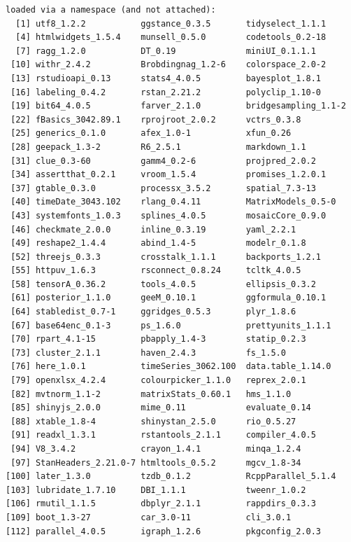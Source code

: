 \documentclass[12pt,twoside]{reedthesis}
\begin{document}
\begin{verbatim}
loaded via a namespace (and not attached):
  [1] utf8_1.2.2           ggstance_0.3.5       tidyselect_1.1.1    
  [4] htmlwidgets_1.5.4    munsell_0.5.0        codetools_0.2-18    
  [7] ragg_1.2.0           DT_0.19              miniUI_0.1.1.1      
 [10] withr_2.4.2          Brobdingnag_1.2-6    colorspace_2.0-2    
 [13] rstudioapi_0.13      stats4_4.0.5         bayesplot_1.8.1     
 [16] labeling_0.4.2       rstan_2.21.2         polyclip_1.10-0     
 [19] bit64_4.0.5          farver_2.1.0         bridgesampling_1.1-2
 [22] fBasics_3042.89.1    rprojroot_2.0.2      vctrs_0.3.8         
 [25] generics_0.1.0       afex_1.0-1           xfun_0.26           
 [28] geepack_1.3-2        R6_2.5.1             markdown_1.1        
 [31] clue_0.3-60          gamm4_0.2-6          projpred_2.0.2      
 [34] assertthat_0.2.1     vroom_1.5.4          promises_1.2.0.1    
 [37] gtable_0.3.0         processx_3.5.2       spatial_7.3-13      
 [40] timeDate_3043.102    rlang_0.4.11         MatrixModels_0.5-0  
 [43] systemfonts_1.0.3    splines_4.0.5        mosaicCore_0.9.0    
 [46] checkmate_2.0.0      inline_0.3.19        yaml_2.2.1          
 [49] reshape2_1.4.4       abind_1.4-5          modelr_0.1.8        
 [52] threejs_0.3.3        crosstalk_1.1.1      backports_1.2.1     
 [55] httpuv_1.6.3         rsconnect_0.8.24     tcltk_4.0.5         
 [58] tensorA_0.36.2       tools_4.0.5          ellipsis_0.3.2      
 [61] posterior_1.1.0      geeM_0.10.1          ggformula_0.10.1    
 [64] stabledist_0.7-1     ggridges_0.5.3       plyr_1.8.6          
 [67] base64enc_0.1-3      ps_1.6.0             prettyunits_1.1.1   
 [70] rpart_4.1-15         pbapply_1.4-3        statip_0.2.3        
 [73] cluster_2.1.1        haven_2.4.3          fs_1.5.0            
 [76] here_1.0.1           timeSeries_3062.100  data.table_1.14.0   
 [79] openxlsx_4.2.4       colourpicker_1.1.0   reprex_2.0.1        
 [82] mvtnorm_1.1-2        matrixStats_0.60.1   hms_1.1.0           
 [85] shinyjs_2.0.0        mime_0.11            evaluate_0.14       
 [88] xtable_1.8-4         shinystan_2.5.0      rio_0.5.27          
 [91] readxl_1.3.1         rstantools_2.1.1     compiler_4.0.5      
 [94] V8_3.4.2             crayon_1.4.1         minqa_1.2.4         
 [97] StanHeaders_2.21.0-7 htmltools_0.5.2      mgcv_1.8-34         
[100] later_1.3.0          tzdb_0.1.2           RcppParallel_5.1.4  
[103] lubridate_1.7.10     DBI_1.1.1            tweenr_1.0.2        
[106] rmutil_1.1.5         dbplyr_2.1.1         rappdirs_0.3.3      
[109] boot_1.3-27          car_3.0-11           cli_3.0.1           
[112] parallel_4.0.5       igraph_1.2.6         pkgconfig_2.0.3     

\end{verbatim}
\end{document}
